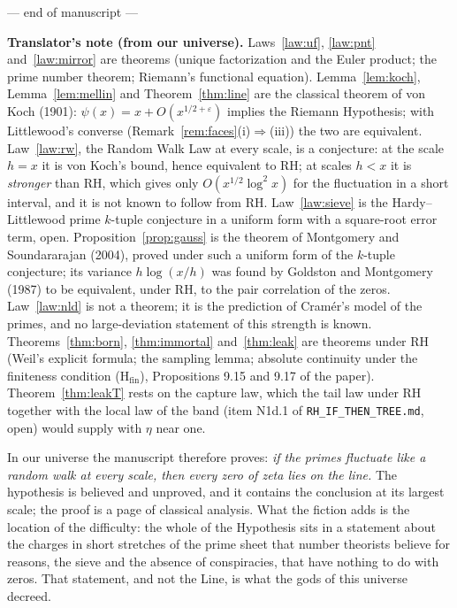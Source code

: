 \documentclass[11pt]{article}
\theoremstyle{definition}
\theoremstyle{remark}
\newcommand{\ps}{\psi}
\begin{document}
\bigskip
\begin{center}--- end of manuscript ---\end{center}
\bigskip

\begin{mdframed}[backgroundcolor=black!4,linewidth=0.4pt]
\small\textbf{Translator's note (from our universe).} Laws~\ref{law:uf}, \ref{law:pnt} and~\ref{law:mirror} are theorems (unique factorization and the Euler product; the prime number theorem; Riemann's functional equation). Lemma~\ref{lem:koch}, Lemma~\ref{lem:mellin} and Theorem~\ref{thm:line} are the classical theorem of von Koch (1901): $\ps(x)=x+O(x^{1/2+\varepsilon})$ implies the Riemann Hypothesis; with Littlewood's converse (Remark~\ref{rem:faces}(i)$\Rightarrow$(iii)) the two are equivalent. Law~\ref{law:rw}, the Random Walk Law at every scale, is a conjecture: at the scale $h=x$ it is von Koch's bound, hence equivalent to RH; at scales $h<x$ it is \emph{stronger} than RH, which gives only $O(x^{1/2}\log^2x)$ for the fluctuation in a short interval, and it is not known to follow from RH. Law~\ref{law:sieve} is the Hardy--Littlewood prime $k$-tuple conjecture in a uniform form with a square-root error term, open. Proposition~\ref{prop:gauss} is the theorem of Montgomery and Soundararajan (2004), proved under such a uniform form of the $k$-tuple conjecture; its variance $h\log(x/h)$ was found by Goldston and Montgomery (1987) to be equivalent, under RH, to the pair correlation of the zeros. Law~\ref{law:nld} is not a theorem; it is the prediction of Cram\'er's model of the primes, and no large-deviation statement of this strength is known. Theorems~\ref{thm:born}, \ref{thm:immortal} and~\ref{thm:leak} are theorems under RH (Weil's explicit formula; the sampling lemma; absolute continuity under the finiteness condition (H$_{\mathrm{fin}}$), Propositions 9.15 and 9.17 of the paper). Theorem~\ref{thm:leakT} rests on the capture law, which the tail law under RH together with the local law of the band (item N1d.1 of \texttt{RH\_IF\_THEN\_TREE.md}, open) would supply with $\eta$ near one.

In our universe the manuscript therefore proves: \emph{if the primes fluctuate like a random walk at every scale, then every zero of zeta lies on the line.} The hypothesis is believed and unproved, and it contains the conclusion at its largest scale; the proof is a page of classical analysis. What the fiction adds is the location of the difficulty: the whole of the Hypothesis sits in a statement about the charges in short stretches of the prime sheet that number theorists believe for reasons, the sieve and the absence of conspiracies, that have nothing to do with zeros. That statement, and not the Line, is what the gods of this universe decreed.
\end{mdframed}
\end{document}
